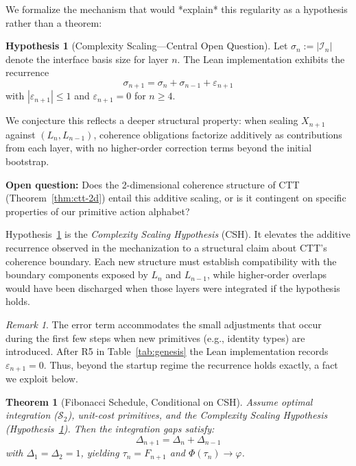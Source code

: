 \documentclass[11pt]{article}
\theoremstyle{definition}
\newtheorem{hypothesis}{Hypothesis}
\theoremstyle{plain}
\newtheorem{theorem}{Theorem}
\theoremstyle{remark}
\newtheorem{remark}{Remark}
\begin{document}
We formalize the mechanism that would *explain* this regularity as a hypothesis 
rather than a theorem:

\begin{hypothesis}[Complexity Scaling—Central Open Question]\label{hyp:csh}
Let $\sigma_n := |\mathcal{I}_n|$ denote the interface basis size for layer $n$.
The Lean implementation exhibits the recurrence
\[
\sigma_{n+1} = \sigma_n + \sigma_{n-1} + \varepsilon_{n+1}
\]
with $|\varepsilon_{n+1}| \leq 1$ and $\varepsilon_{n+1} = 0$ for $n \geq 4$.

We conjecture this reflects a deeper structural property: when sealing $X_{n+1}$ 
against $(L_n, L_{n-1})$, coherence obligations factorize additively as 
contributions from each layer, with no higher-order correction terms beyond the 
initial bootstrap.

\textbf{Open question:} Does the 2-dimensional coherence structure of CTT 
(Theorem~\ref{thm:ctt-2d}) entail this additive scaling, or is it contingent 
on specific properties of our primitive action alphabet?
\end{hypothesis}

Hypothesis~\ref{hyp:csh} is the \emph{Complexity Scaling Hypothesis} (CSH). It
elevates the additive recurrence observed in the mechanization to a structural
claim about CTT's coherence boundary. Each new structure must establish
compatibility with the boundary components exposed by $L_n$ and $L_{n-1}$,
while higher-order overlaps would have been discharged when those layers were
integrated if the hypothesis holds.

\begin{remark}
The error term accommodates the small adjustments that occur during the first
few steps when new primitives (e.g., identity types) are introduced. After R5 in
Table~\ref{tab:genesis} the Lean implementation records $\varepsilon_{n+1} = 0$.
Thus, beyond the startup regime the recurrence holds exactly, a fact we exploit
below.
\end{remark}

\begin{theorem}[Fibonacci Schedule, Conditional on CSH]\label{thm:fibonacci-conditional}
Assume optimal integration ($\mathcal{S}_2$), unit-cost primitives, and the
Complexity Scaling Hypothesis (Hypothesis~\ref{hyp:csh}). Then the integration 
gaps satisfy:
\[
\Delta_{n+1} = \Delta_n + \Delta_{n-1}
\]
with $\Delta_1 = \Delta_2 = 1$, yielding $\tau_n = F_{n+1}$ and 
$\Phi(\tau_n) \to \varphi$.
\end{theorem}
\end{document}
